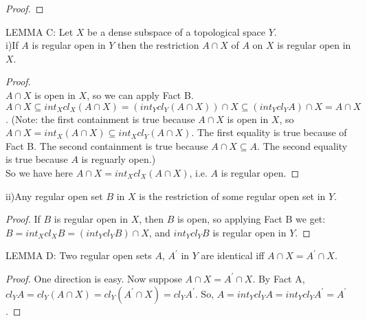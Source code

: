 \documentclass{amsart}
\begin{document}
{\begin{proof}
\end{proof}

	

LEMMA C: Let $X$ be a dense subspace of a topological space $Y$.\\
i)If $A$ is regular open in $Y$ then the restriction $A\cap X$ of $A$ on $X$ is regular open in $X$. 
\begin{proof}\\
$A\cap X$ is open in $X$, so we can apply Fact B.
$A\cap X \subseteq int_X cl_X (A\cap X) = (int_Y cl_Y (A\cap X))\cap X \subseteq (int_Y cl_Y A) \cap X = A\cap X$. (Note: the first containment is true because $A\cap X$ is open in $X$, so $A\cap X = int_X (A\cap X) \subseteq int_X cl_Y (A\cap X)$. The first equality is true because of Fact B. The second containment is true because $A\cap X \subseteq A$. The second equality is true because $A$ is reguarly open.)\\
So we have here $A\cap X = int_X cl_X (A\cap X)$, i.e. $A$ is regular open.
\end{proof}


ii)Any regular open set $B$ in $X$ is the restriction of some regular open set in $Y$. 

\begin{proof}
If $B$ is regular open in $X$, then $B$ is open, so applying Fact B we get:
$B= int_X cl_XB = (int_Y cl_Y B)\cap X$, and $int_Y cl_Y B$ is regular open in $Y$.


			\begin{comment}
			(Note: $int_Y cl_Y int_Y cl_Y B = int_Y cl_Y B$ because for 
			$\subseteq$: $int_Y cl_Y int_Y cl_Y B \subseteq int_Y cl_Y cl_Y B = int_Y cl_Y B$. 
			On the other hand for $\supseteq$: Since  $int_Y cl_Y B$ is open in $X$, write $U=int_Y cl_Y B$ 
			and $U= int_Y U \subseteq int_Y cl_Y U$.)

			So we have $B$ as an intersection of a regular open set in $Y$ (namely int_Y cl_Y B) and  $X$.
			\end{comment}


\end{proof}



	

LEMMA D: Two regular open sets $A$, $A^\prime  $ in $Y$ are identical iff $A\cap X = A^\prime   \cap X$.

\begin{proof}
One direction is easy. Now suppose $A\cap X = A^\prime \cap X$. By Fact A, $cl_Y A= cl_Y (A\cap X) = cl_Y (A^\prime \cap X)= cl_YA^
\prime$. So, $A=int_Y cl_Y A = int_Y cl_Y A^\prime = A^\prime$.
\end{proof}


}
\end{document}
